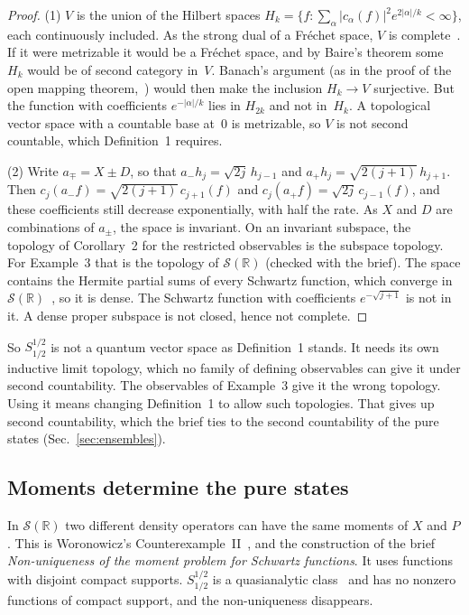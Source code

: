 \documentclass[11pt]{article}
\theoremstyle{definition}
\begin{document}
\begin{proof}
  (1) $V$ is the union of the Hilbert spaces
  $H_k = \{f : \sum_\alpha |c_\alpha(f)|^2 e^{2|\alpha|/k} < \infty\}$, each continuously
  included. As the strong dual of a Fr\'echet space, $V$ is complete~\cite[Cor.~2.6]{vogt}. If
  it were metrizable it would be a Fr\'echet space, and by Baire's theorem some $H_k$ would be of
  second category in~$V$. Banach's argument (as in the proof of the open mapping
  theorem,~\cite[Lemmas~1.4, 1.5]{vogt}) would then make the inclusion $H_k \to V$ surjective.
  But the function with coefficients $e^{-|\alpha|/k}$ lies in $H_{2k}$ and not in~$H_k$. A
  topological vector space with a countable base at~$0$ is metrizable, so $V$ is not second
  countable, which Definition~1 requires.

  (2) Write $a_\mp = X \pm D$, so that $a_- h_j = \sqrt{2j}\,h_{j-1}$ and
  $a_+ h_j = \sqrt{2(j+1)}\,h_{j+1}$. Then $c_j(a_- f) = \sqrt{2(j+1)}\,c_{j+1}(f)$ and
  $c_j(a_+ f) = \sqrt{2j}\,c_{j-1}(f)$, and these coefficients still decrease exponentially, with
  half the rate. As $X$ and $D$ are combinations of $a_\pm$, the space is invariant. On an
  invariant subspace, the topology of Corollary~2 for the restricted observables is the subspace
  topology. For Example~3 that is the topology of $\mathcal S(\mathbb R)$ (checked with the brief).
  The space contains the Hermite partial sums of every Schwartz function, which converge in
  $\mathcal S(\mathbb R)$~\cite{simon}, so it is dense. The Schwartz function with coefficients
  $e^{-\sqrt{j+1}}$ is not in it. A dense proper subspace is not closed, hence not complete.
\end{proof}

So $S^{1/2}_{1/2}$ is not a quantum vector space as Definition~1 stands. It needs its own
inductive limit topology, which no family of defining observables can give it under
second countability. The observables of Example~3 give it the wrong topology. Using it means
changing Definition~1 to allow such topologies. That gives up second countability, which the
brief ties to the second countability of the pure states (Sec.~\ref{sec:ensembles}).

\subsection{Moments determine the pure states}

In $\mathcal S(\mathbb R)$ two different density operators can have the same moments of $X$
and $P$. This is Woronowicz's Counterexample~II~\cite{woronowicz70}, and the construction of the
brief \emph{Non-uniqueness of the moment problem for Schwartz functions}. It uses functions with
disjoint compact supports. $S^{1/2}_{1/2}$ is a quasianalytic class~\cite[Sec.~1]{lcp} and has
no nonzero functions of compact support, and the non-uniqueness disappears.
\end{document}
